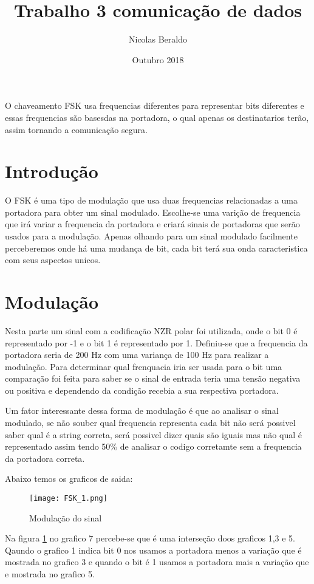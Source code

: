 \documentclass{article}
\title{Trabalho 3 comunicação de dados}
\author{Nicolas Beraldo}
\date{Outubro 2018}
\begin{document}
    \maketitle
        \begin{center}
            O chaveamento FSK usa frequencias diferentes para representar bits diferentes e essas frequencias são basesdas na portadora, o qual apenas os destinatarios terão, assim tornando a comunicação segura.
        \end{center}
    \section*{Introdução}
       O FSK é uma tipo de modulação que usa duas frequencias relacionadas a uma portadora para obter um sinal modulado. Escolhe-se uma varição de frequencia que irá variar a frequencia da portadora e criará sinais de portadoras que serão usados para a modulação. Apenas olhando para um sinal modulado facilmente perceberemos onde há uma mudança de bit, cada bit terá sua onda caracteristica com seus aspectos unicos.
    \section{Modulação}
        Nesta parte um sinal com a codificação NZR polar foi utilizada, onde o bit 0 é representado por -1 e o bit 1 é representado por 1. Definiu-se que a frequencia da portadora seria de 200 Hz com uma variança de 100 Hz para realizar a modulação. Para determinar qual frenquacia iria ser usada para o bit uma comparação foi feita para saber se o sinal de entrada teria uma tensão negativa ou positiva e dependendo da condição recebia a sua respectiva portadora. 
        
        Um fator interessante dessa forma de modulação é que ao analisar o sinal modulado, se não souber qual frequencia representa cada bit não será possivel saber qual é a string correta, será possivel dizer quais são iguais mas não qual é representado assim tendo 50\% de analisar o codigo corretamte sem a frequencia da portadora correta.
        
        Abaixo temos os graficos de saida:
        \begin{figure}[H]
            \centering
            \texttt{[image: FSK\_1.png]}
            \caption{Modulação do sinal}
            \label{fig:modulacao}
        \end{figure}
        Na figura \ref{fig:modulacao} no grafico 7 percebe-se que é uma interseção doos graficos 1,3 e 5. Qaundo o grafico 1 indica bit 0 nos usamos a portadora menos a variação que é mostrada no grafico 3 e quando o bit é 1 usamos a portadora mais a variação que e mostrada no grafico 5.
        
\end{document}
